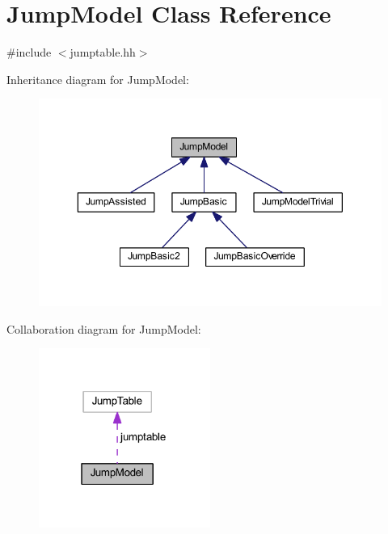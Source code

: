 \hypertarget{class_jump_model}{}\section{Jump\+Model Class Reference}
\label{class_jump_model}


{\ttfamily \#include $<$jumptable.\+hh$>$}



Inheritance diagram for Jump\+Model\+:
\nopagebreak
\begin{figure}[H]
\begin{center}
\leavevmode
\includegraphics[width=350pt]{class_jump_model__inherit__graph}
\end{center}
\end{figure}


Collaboration diagram for Jump\+Model\+:
\nopagebreak
\begin{figure}[H]
\begin{center}
\leavevmode
\includegraphics[width=159pt]{class_jump_model__coll__graph}
\end{center}
\end{figure}
